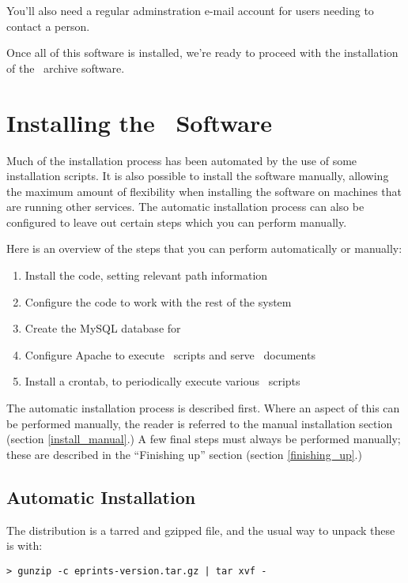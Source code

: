 You'll also need a regular adminstration e-mail account for users needing to contact a person.

Once all of this software is installed, we're ready to proceed with the installation of the \eprints\ archive software.


\section{Installing the \eprints\ Software}
\label{install_software}

Much of the installation process has been automated by the use of some installation scripts.  It is also possible to install the software manually, allowing the maximum amount of flexibility when installing the software on machines that are running other services.  The automatic installation process can also be configured to leave out certain steps which you can perform manually.

Here is an overview of the steps that you can perform automatically or manually:

\begin{enumerate}
\item Install the code, setting relevant path information
\item Configure the code to work with the rest of the system
\item Create the MySQL database for \eprints\ 
\item Configure Apache to execute \eprints\ scripts and serve \eprints\ documents
\item Install a crontab, to periodically execute various \eprints\ scripts
\end{enumerate}

The automatic installation process is described first.  Where an aspect of this can be performed manually, the reader is referred to the manual installation section (section \ref{install_manual}.)  A few final steps must always be performed manually; these are described in the ``Finishing up'' section (section \ref{finishing_up}.)


\subsection{Automatic Installation}

The distribution is a tarred and gzipped file, and the usual way to unpack these is with:

\begin{verbatim}
> gunzip -c eprints-version.tar.gz | tar xvf -
\end{verbatim}

